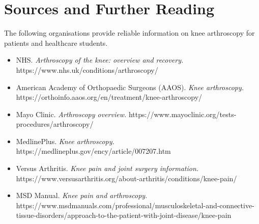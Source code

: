\section*{Sources and Further Reading}
The following organisations provide reliable information on knee arthroscopy for patients and healthcare students.

\begin{itemize}
    \item NHS. \textit{Arthroscopy of the knee: overview and recovery.} https://www.nhs.uk/conditions/arthroscopy/
    \item American Academy of Orthopaedic Surgeons (AAOS). \textit{Knee arthroscopy.} https://orthoinfo.aaos.org/en/treatment/knee-arthroscopy/
    \item Mayo Clinic. \textit{Arthroscopy overview.} https://www.mayoclinic.org/tests-procedures/arthroscopy/
    \item MedlinePlus. \textit{Knee arthroscopy.} https://medlineplus.gov/ency/article/007207.htm
    \item Versus Arthritis. \textit{Knee pain and joint surgery information.} https://www.versusarthritis.org/about-arthritis/conditions/knee-pain/
    \item MSD Manual. \textit{Knee pain and arthroscopy.} https://www.msdmanuals.com/professional/musculoskeletal-and-connective-tissue-disorders/approach-to-the-patient-with-joint-disease/knee-pain
\end{itemize}
